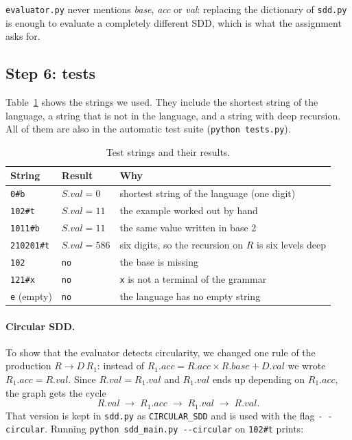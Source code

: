 \documentclass[11pt]{article}
\begin{document}
\texttt{evaluator.py} never mentions \textit{base}, \textit{acc} or \textit{val}:
replacing the dictionary of \texttt{sdd.py} is enough to evaluate a completely different
SDD, which is what the assignment asks for.

\subsection{Step 6: tests}

Table~\ref{tab:tests} shows the strings we used. They include the shortest string of the
language, a string that is not in the language, and a string with deep recursion. All of
them are also in the automatic test suite (\texttt{python tests.py}).

\begin{table}[h]
\centering
\small
\begin{tabular}{@{}lll@{}}
\toprule
\textbf{String} & \textbf{Result} & \textbf{Why} \\
\midrule
\texttt{0\#b}       & $S.val = 0$   & shortest string of the language (one digit) \\
\texttt{102\#t}     & $S.val = 11$  & the example worked out by hand \\
\texttt{1011\#b}    & $S.val = 11$  & the same value written in base 2 \\
\texttt{210201\#t}  & $S.val = 586$ & six digits, so the recursion on $R$ is six levels deep \\
\texttt{102}        & \texttt{no}   & the base is missing \\
\texttt{121\#x}     & \texttt{no}   & \texttt{x} is not a terminal of the grammar \\
\texttt{e} (empty)  & \texttt{no}   & the language has no empty string \\
\bottomrule
\end{tabular}
\caption{Test strings and their results.}
\label{tab:tests}
\end{table}

\paragraph{Circular SDD.} To show that the evaluator detects circularity, we changed one
rule of the production $R \rightarrow D\,R_1$: instead of
$R_1.acc = R.acc \times R.base + D.val$ we wrote $R_1.acc = R.val$. Since
$R.val = R_1.val$ and $R_1.val$ ends up depending on $R_1.acc$, the graph gets the cycle
\[
  R.val \;\rightarrow\; R_1.acc \;\rightarrow\; R_1.val \;\rightarrow\; R.val .
\]
That version is kept in \texttt{sdd.py} as \texttt{CIRCULAR\_SDD} and is used with the
flag \texttt{-\,-circular}. Running \verb|python sdd_main.py --circular| on
\texttt{102\#t} prints:
\end{document}
